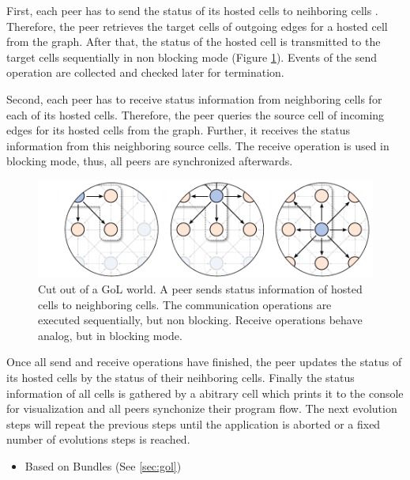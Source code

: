 First, each peer has to send the status of its hosted cells to
neihboring cells . Therefore, the peer retrieves the target cells of
outgoing edges for a hosted cell from the graph. After that, the
status of the hosted cell is transmitted to the target cells
sequentially in non blocking mode (Figure
\ref{fig:gol_communication}). Events of the send operation are
collected and checked later for termination.

Second, each peer has to receive status information from neighboring
cells for each of its hosted cells. Therefore, the peer queries the
source cell of incoming edges for its hosted cells from the
graph. Further, it receives the status information from this
neighboring source cells.  The receive operation is used in blocking
mode, thus, all peers are synchronized afterwards.

\begin{figure}[H]
  \centering
  \includegraphics[width=\textwidth]{graphics/40_gol_communication}
  \caption{Cut out of a GoL world. A peer sends status information of
    hosted cells to neighboring cells. The communication operations
    are executed sequentially, but non blocking. Receive operations
    behave analog, but in blocking mode.}
  \label{fig:gol_communication}
\end{figure}

Once all send and receive operations have finished, the peer updates
the status of its hosted cells by the status of their neihboring
cells. Finally the status information of all cells is gathered by a
abitrary cell which prints it to the console for visualization and all
peers synchonize their program flow.  The next evolution steps will
repeat the previous steps until the application is aborted or a fixed
number of evolutions steps is reached.

\begin{itemize}
\item Based on Bundles (See \ref{sec:gol})
\end{itemize}

